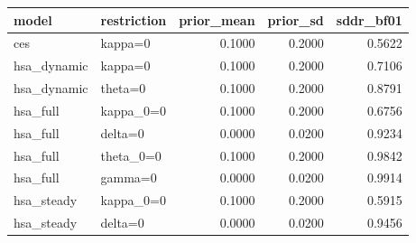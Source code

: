 \begin{tabular}{llrrr}
\toprule
model & restriction & prior\_mean & prior\_sd & sddr\_bf01 \\
\midrule
ces & kappa=0 & 0.1000 & 0.2000 & 0.5622 \\
hsa\_dynamic & kappa=0 & 0.1000 & 0.2000 & 0.7106 \\
hsa\_dynamic & theta=0 & 0.1000 & 0.2000 & 0.8791 \\
hsa\_full & kappa\_0=0 & 0.1000 & 0.2000 & 0.6756 \\
hsa\_full & delta=0 & 0.0000 & 0.0200 & 0.9234 \\
hsa\_full & theta\_0=0 & 0.1000 & 0.2000 & 0.9842 \\
hsa\_full & gamma=0 & 0.0000 & 0.0200 & 0.9914 \\
hsa\_steady & kappa\_0=0 & 0.1000 & 0.2000 & 0.5915 \\
hsa\_steady & delta=0 & 0.0000 & 0.0200 & 0.9456 \\
\bottomrule
\end{tabular}
